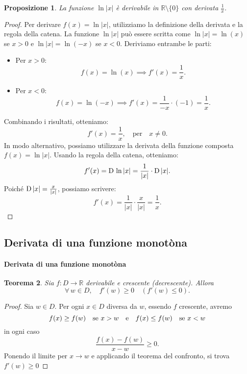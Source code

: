 \documentclass{article}
\theoremstyle{plain}
\newtheorem{thm}{Teorema}[section]
\newtheorem{prop}[thm]{Proposizione}
\theoremstyle{definition}
\theoremstyle{remark}
\begin{document}
\vspace{10pt}

\begin{bxthm}
\begin{prop}
    La funzione $\ln|x|$ è derivabile in $\mathbb{R}\setminus\{0\}$ con derivata $\frac{1}{x}$.
\end{prop}
\end{bxthm}
\begin{proof}
    Per derivare $f(x)=\ln|x|$, utilizziamo la definizione della derivata e la regola della catena. 
    La funzione \( \ln|x| \) può essere scritta come \( \ln|x| = \ln(x) \) se \( x > 0 \) e \( \ln|x| = \ln(-x) \) se \( x < 0 \).
    Deriviamo entrambe le parti:
    \begin{itemize}
        \item Per \( x > 0 \):
        \[f(x) = \ln(x) \implies f'(x) = \frac{1}{x}.\]
        \item Per \( x < 0 \):
        \[f(x) = \ln(-x) \implies f'(x) = \frac{1}{-x} \cdot (-1) = \frac{1}{x}.\]
    \end{itemize}
    Combinando i risultati, otteniamo:
    \[
    f'(x) = \frac{1}{x}, \quad \text{per} \quad x \neq 0.
    \]
    In modo alternativo, possiamo utilizzare la derivata della funzione composta \( f(x) = \ln|x| \). Usando la regola della catena, otteniamo:
    \[
    f'(x) = \textup{D}\, \ln|x| = \frac{1}{|x|} \cdot \textup{D}\,|x|.
    \]
    Poiché \(\textup{D}\,|x| = \frac{x}{|x|}\), possiamo scrivere:
    \[
    f'(x) = \frac{1}{|x|} \cdot \frac{x}{|x|} = \frac{1}{x}.
    \]
\end{proof}


\vspace{10pt}

\subsection{Derivata di una funzione monotòna}

\vspace{10pt}

\paragraph{Derivata di una funzione monotòna}
\begin{bxthm}
\begin{thm}\label{deisegni}
    Sia $f:D\to\mathbb{R}$ derivabile e crescente (decrescente).
    Allora \[\forall\,w\in D,\quad f'(w)\geq0 \quad(f'(w)\leq0).\]
\end{thm}
\end{bxthm}
\begin{proof}
    Sia $w\in D$. 
    Per ogni $x\in D$ diversa da $w$, essendo $f$ crescente, avremo
    \[f(x)\geq f(w)\quad\textup{se }x>w\quad\textup{e}\quad f(x)\leq f(w)\quad\textup{se }x<w\]
    in ogni caso
    \[\dfrac{f(x)-f(w)}{x-w}\geq0.\]
    Ponendo il limite per $x\to w$ e applicando il teorema del confronto, si trova $f'(w)\geq0$
\end{proof}
\end{document}
